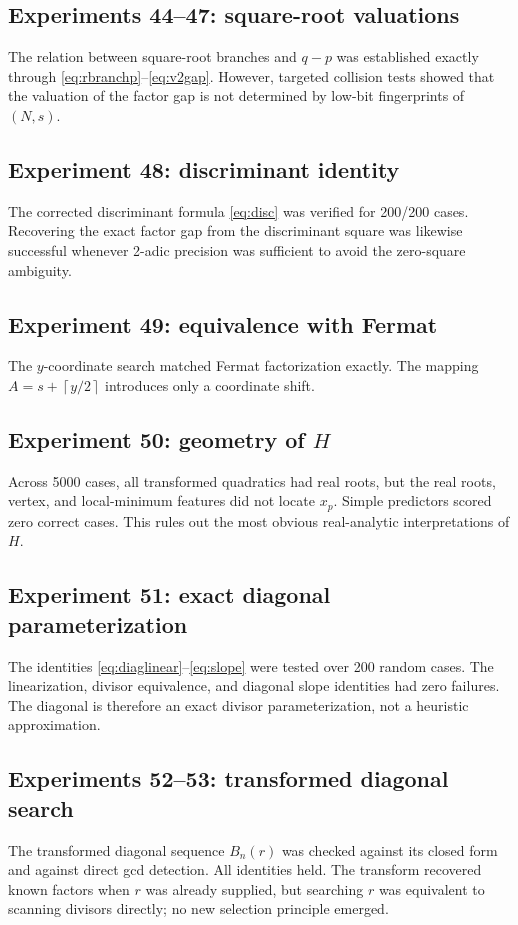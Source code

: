 \documentclass[11pt,a4paper]{article}
\newcommand{\ceil}[1]{\left\lceil #1 \right\rceil}
\begin{document}
\subsection*{Experiments 44--47: square-root valuations}
The relation between square-root branches and \(q-p\) was established exactly through \eqref{eq:rbranchp}--\eqref{eq:v2gap}. However, targeted collision tests showed that the valuation of the factor gap is not determined by low-bit fingerprints of \((N,s)\).

\subsection*{Experiment 48: discriminant identity}
The corrected discriminant formula \eqref{eq:disc} was verified for 200/200 cases. Recovering the exact factor gap from the discriminant square was likewise successful whenever 2-adic precision was sufficient to avoid the zero-square ambiguity.

\subsection*{Experiment 49: equivalence with Fermat}
The \(y\)-coordinate search matched Fermat factorization exactly. The mapping \(A=s+\ceil{y/2}\) introduces only a coordinate shift.

\subsection*{Experiment 50: geometry of \(H\)}
Across 5000 cases, all transformed quadratics had real roots, but the real roots, vertex, and local-minimum features did not locate \(x_p\). Simple predictors scored zero correct cases. This rules out the most obvious real-analytic interpretations of \(H\).

\subsection*{Experiment 51: exact diagonal parameterization}
The identities \eqref{eq:diaglinear}--\eqref{eq:slope} were tested over 200 random cases. The linearization, divisor equivalence, and diagonal slope identities had zero failures. The diagonal is therefore an exact divisor parameterization, not a heuristic approximation.

\subsection*{Experiments 52--53: transformed diagonal search}
The transformed diagonal sequence \(B_n(r)\) was checked against its closed form and against direct gcd detection. All identities held. The transform recovered known factors when \(r\) was already supplied, but searching \(r\) was equivalent to scanning divisors directly; no new selection principle emerged.
\end{document}
